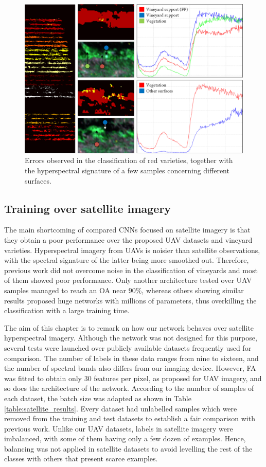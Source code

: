 \begin{figure}[ht]
    \centering
    \includegraphics[width=\linewidth]{figs/vineyard_classification/spatial_labelling.png}
	\caption{Errors observed in the classification of red varieties, together with the hyperspectral signature of a few samples concerning different surfaces.  }
	\label{fig:spatial_labelling_errors}
\end{figure}

\subsection{Training over satellite imagery}

The main shortcoming of compared CNNs focused on satellite imagery is that they obtain a poor performance over the proposed UAV datasets and vineyard varieties. Hyperspectral imagery from UAVs is noisier than satellite observations, with the spectral signature of the latter being more smoothed out. Therefore, previous work did not overcome noise in the classification of vineyards and most of them showed poor performance. Only another architecture tested over UAV samples managed to reach an OA near 90\%, whereas others showing similar results proposed huge networks with millions of parameters, thus overkilling the classification with a large training time. 

The aim of this chapter is to remark on how our network behaves over satellite hyperspectral imagery. Although the network was not designed for this purpose, several tests were launched over publicly available datasets frequently used for comparison. The number of labels in these data ranges from nine to sixteen, and the number of spectral bands also differs from our imaging device. However, FA was fitted to obtain only 30 features per pixel, as proposed for UAV imagery, and so does the architecture of the network. According to the number of samples of each dataset, the batch size was adapted as shown in Table \ref{table:satellite_results}. Every dataset had unlabelled samples which were removed from the training and test datasets to establish a fair comparison with previous work. Unlike our UAV datasets, labels in satellite imagery were imbalanced, with some of them having only a few dozen of examples. Hence, balancing was not applied in satellite datasets to avoid levelling the rest of the classes with others that present scarce examples. 

